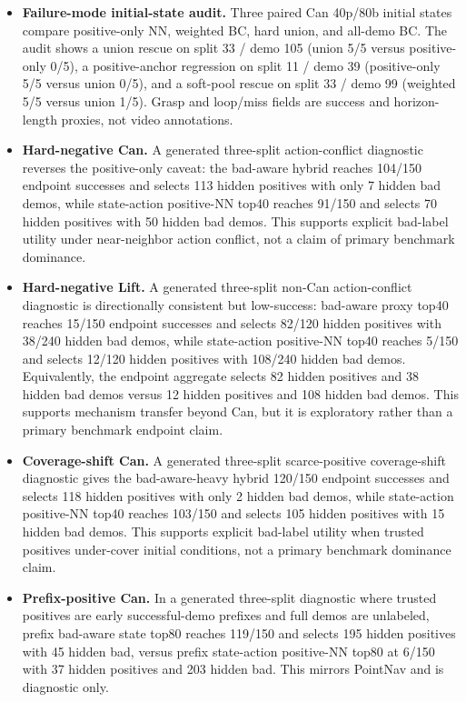 \documentclass[11pt]{article}
\begin{document}
\begin{itemize}[leftmargin=*]
  \item \textbf{Failure-mode initial-state audit.} Three paired Can 40p/80b initial states compare positive-only NN, weighted BC, hard union, and all-demo BC. The audit shows a union rescue on split 33 / demo 105 (union 5/5 versus positive-only 0/5), a positive-anchor regression on split 11 / demo 39 (positive-only 5/5 versus union 0/5), and a soft-pool rescue on split 33 / demo 99 (weighted 5/5 versus union 1/5). Grasp and loop/miss fields are success and horizon-length proxies, not video annotations.
  \item \textbf{Hard-negative Can.} A generated three-split action-conflict diagnostic reverses the positive-only caveat: the bad-aware hybrid reaches 104/150 endpoint successes and selects 113 hidden positives with only 7 hidden bad demos, while state-action positive-NN top40 reaches 91/150 and selects 70 hidden positives with 50 hidden bad demos. This supports explicit bad-label utility under near-neighbor action conflict, not a claim of primary benchmark dominance.
  \item \textbf{Hard-negative Lift.} A generated three-split non-Can action-conflict diagnostic is directionally consistent but low-success: bad-aware proxy top40 reaches 15/150 endpoint successes and selects 82/120 hidden positives with 38/240 hidden bad demos, while state-action positive-NN top40 reaches 5/150 and selects 12/120 hidden positives with 108/240 hidden bad demos. Equivalently, the endpoint aggregate selects 82 hidden positives and 38 hidden bad demos versus 12 hidden positives and 108 hidden bad demos. This supports mechanism transfer beyond Can, but it is exploratory rather than a primary benchmark endpoint claim.
  \item \textbf{Coverage-shift Can.} A generated three-split scarce-positive coverage-shift diagnostic gives the bad-aware-heavy hybrid 120/150 endpoint successes and selects 118 hidden positives with only 2 hidden bad demos, while state-action positive-NN top40 reaches 103/150 and selects 105 hidden positives with 15 hidden bad demos. This supports explicit bad-label utility when trusted positives under-cover initial conditions, not a primary benchmark dominance claim.
  \item \textbf{Prefix-positive Can.} In a generated three-split diagnostic where trusted positives are early successful-demo prefixes and full demos are unlabeled, prefix bad-aware state top80 reaches 119/150 and selects 195 hidden positives with 45 hidden bad, versus prefix state-action positive-NN top80 at 6/150 with 37 hidden positives and 203 hidden bad. This mirrors PointNav and is diagnostic only.

\end{itemize}
\end{document}
